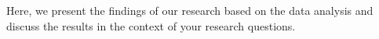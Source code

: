 Here, we present the findings of our research based on the data analysis and discuss the results in the context of your research questions.
